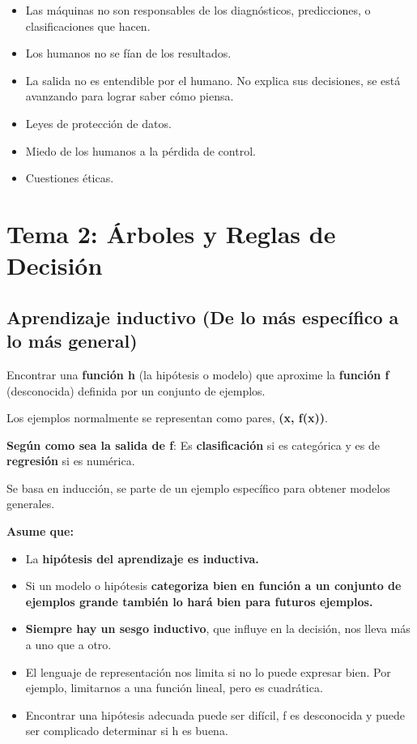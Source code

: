 \documentclass[12pt, twoside, openright]{report} %
\begin{document}
\begin{itemize}
	\item Las máquinas no son responsables de los diagnósticos, predicciones, o
	      clasificaciones que hacen.
	\item Los humanos no se fían de los resultados.
	\item La salida no es entendible por el humano. No explica sus decisiones,
	      se está avanzando para lograr saber cómo piensa.
	\item Leyes de protección de datos.
	\item Miedo de los humanos a la pérdida de control.
	\item Cuestiones éticas.
\end{itemize}

\chapter{Tema 2: Árboles y Reglas de Decisión}

\section{Aprendizaje inductivo (De lo más específico a lo más general)}

Encontrar una \textbf{función h} (la hipótesis o modelo) que aproxime la \textbf{función f} (desconocida) definida por un conjunto de ejemplos.

Los ejemplos normalmente se representan como pares, \textbf{(x, f(x))}.

\textbf{Según como sea la salida de f}: Es \textbf{clasificación} si es
categórica y es de \textbf{regresión} si es numérica.

Se basa en inducción, se parte de un ejemplo específico para obtener
modelos generales.

\textbf{Asume que:}

\begin{itemize}
	\item La \textbf{hipótesis del aprendizaje es inductiva.}
	\item Si un modelo o hipótesis \textbf{categoriza bien en función a un
		      conjunto de ejemplos grande también lo hará bien para futuros
		      ejemplos.}
	\item \textbf{Siempre hay un sesgo inductivo}, que influye en la decisión,
	      nos lleva más a uno que a otro.
	\item El lenguaje de representación nos limita si no lo puede expresar bien.
	      Por ejemplo, limitarnos a una función lineal, pero es cuadrática.
	\item Encontrar una hipótesis adecuada puede ser difícil, f es desconocida y
	      puede ser complicado determinar si h es buena.
\end{itemize}
\end{document}
